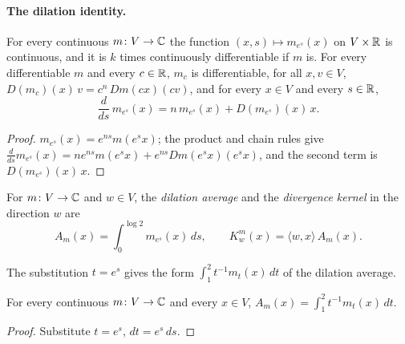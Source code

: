 \paragraph{The dilation identity.}

\begin{lemma}
\label{lem:exponential-dilation}
\leanok
{}
For every continuous $m \colon V \to \mathbb{C}$ the function $(x, s) \mapsto m_{e^s}(x)$ on
$V \times \mathbb{R}$ is continuous, and it is $k$ times continuously differentiable if $m$ is. For every
differentiable $m$ and every $c \in \mathbb{R}$, $m_c$ is differentiable, for all $x, v \in V$,
$D(m_c)(x) \, v = c^n \, Dm(c x)(c v)$, and for every $x \in V$ and every $s \in \mathbb{R}$,
\[
  \frac{d}{ds} \, m_{e^s}(x) = n \, m_{e^s}(x) + D(m_{e^s})(x) \, x .
\]
\end{lemma}

\begin{proof}
\leanok
$m_{e^s}(x) = e^{ns} m(e^s x)$; the product and chain rules give
$\frac{d}{ds} m_{e^s}(x) = n e^{ns} m(e^s x) + e^{ns} Dm(e^s x)(e^s x)$, and the second term is
$D(m_{e^s})(x) \, x$.
\end{proof}

\begin{definition}
\label{def:divergence-kernel}
\leanok
{}
For $m \colon V \to \mathbb{C}$ and $w \in V$, the \emph{dilation average} and the \emph{divergence
kernel} in the direction $w$ are
\[
  A_m(x) = \int_0^{\log 2} m_{e^s}(x) \, ds , \qquad K^m_w(x) = \langle w, x \rangle \, A_m(x) .
\]
\end{definition}

The substitution $t = e^s$ gives the form $\int_1^2 t^{-1} m_t(x) \, dt$ of the dilation average.

\begin{lemma}
\label{lem:dilation-average-substitution}
\leanok
{}
For every continuous $m \colon V \to \mathbb{C}$ and every $x \in V$,
$A_m(x) = \int_1^2 t^{-1} m_t(x) \, dt$.
\end{lemma}

\begin{proof}
\leanok
Substitute $t = e^s$, $dt = e^s \, ds$.
\end{proof}

